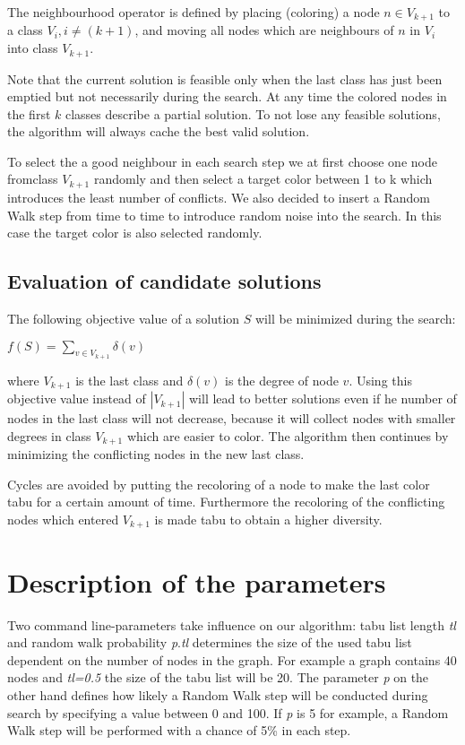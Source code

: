 \documentclass[a4paper]{scrartcl}
\begin{document}
The neighbourhood operator is defined by placing (coloring) a node $n \in V_{k+1}$ to a class $V_i, i \neq (k+1)$, and moving all nodes which are neighbours of $n$ in $V_i$ into class $V_{k+1}$.

Note that the current solution is feasible only when the last class has just been emptied but not necessarily during the search. At any time the colored nodes in the first $k$ classes describe a partial solution. To not lose any feasible solutions, the algorithm will always cache the best valid solution.

To select the a good neighbour in each search step we at first choose one node fromclass $V_{k+1}$ randomly and then select a target color between 1 to k which introduces the least number of conflicts.
We also decided to insert a Random Walk step from time to time to introduce random noise into the search. In this case the target color is also selected randomly.

\subsection{Evaluation of candidate solutions}

The following objective value of a solution $S$ will be minimized during the search:
\begin{center}
$f(S) = \sum_{v \in V_{k+1}} \delta(v)$
\end{center}
where $V_{k+1}$ is the last class and $\delta(v)$ is the degree of node $v$.
Using this objective value instead of $|V_{k+1}|$ will lead to better solutions even if he number of nodes in the last class will not decrease, because it will collect nodes with smaller degrees in class $V_{k+1}$ which are easier to color.
The algorithm then continues by minimizing the conflicting nodes in the new last class.

Cycles are avoided by putting the recoloring of a node to make the last color tabu  for a certain amount of time. Furthermore the recoloring of the conflicting nodes which entered $V_{k+1}$ is made tabu to obtain a higher diversity.

\section{Description of the parameters}

Two command line-parameters take influence on our algorithm: tabu list length \emph{tl} and random walk probability \emph{p}.\emph{tl} determines the size of the used tabu list dependent on the number of nodes in the graph. For example a graph contains 40 nodes and \emph{tl=0.5} the size of the tabu list will be 20.
The parameter \emph{p} on the other hand defines how likely a Random Walk step will be conducted during search by specifying a value between 0 and 100. If \emph{p} is 5 for example, a Random Walk step will be performed with a chance of 5\% in each step.
\end{document}
